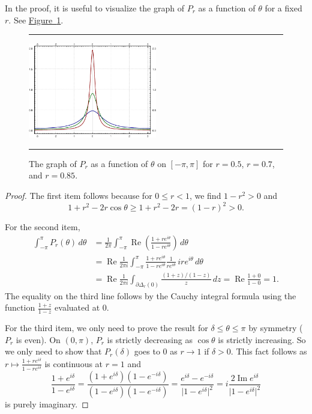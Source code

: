 \documentclass[12pt,openany]{book}
\renewcommand{\Re}{\operatorname{Re}}
\renewcommand{\Im}{\operatorname{Im}}
\newcommand{\sabs}[1]{\lvert {#1} \rvert}
\theoremstyle{plain}
\theoremstyle{remark}
\theoremstyle{definition}
\newenvironment{myfig}{%
\begin{figure}[h!t]
\noindent\rule{\textwidth}{0.5pt}\vspace{12pt}\par\centering}%
{\par\noindent\rule{\textwidth}{0.5pt}
\end{figure}}
\theoremstyle{exercise}
\theoremstyle{example}
\newcommand{\figureref}[1]{\hyperref[#1]{Figure~\ref*{#1}}}
\begin{document}
In the proof, it is useful to visualize the graph of
$P_r$ as a function of $\theta$ for a fixed $r$.
See \figureref{fig:poisson2dgraph}.

\begin{myfig}
\includegraphics[width=0.5\textwidth]{figures/poisson-kernel.pdf}
\caption{The graph of $P_r$ as a function of $\theta$ on $[-\pi,\pi]$ for
$r=0.5$, $r=0.7$, and $r=0.85$.\label{fig:poisson2dgraph}}
\end{myfig}

\begin{proof}
The first item follows because
for $0 \leq r < 1$, we find
$1-r^2 > 0$
and
\begin{equation*}
1+r^2-2r \cos\theta \geq 1+r^2-2r = {(1-r)}^2 > 0 .
\end{equation*}

For the second item,
\begin{equation*}
\begin{split}
\int_{-\pi}^{\pi}
P_r(\theta) \, d\theta
& =
\frac{1}{2\pi}
\int_{-\pi}^{\pi}
\Re
\left(
\frac{1+re^{i\theta}}{1-re^{i\theta}}
\right)
\, d\theta
\\
& =
\Re
\frac{1}{2\pi i}
\int_{-\pi}^{\pi}
\frac{1+re^{i\theta}}{1-re^{i\theta}} \frac{1}{re^{i\theta}} \,
ire^{i\theta}
\, d\theta
\\
& = 
\Re
\frac{1}{2\pi i}
\int_{\partial \Delta_r(0)}
\frac{(1+z)/(1-z)}{z} \, dz
=
\Re \frac{1+0}{1-0} = 1 .
\end{split}
\end{equation*}
The equality on the third line follows by the Cauchy integral formula
using the function $\frac{1+z}{1-z}$ evaluated at $0$.

For the third item, we only need to prove the
result for $\delta \leq \theta \leq \pi$ by symmetry ($P_r$ is even).
On $(0,\pi)$, $P_r$ is strictly decreasing as $\cos \theta$ is strictly
increasing.  So we only need to show that $P_r(\delta)$ goes to $0$
as $r \to 1$ if $\delta > 0$.
This fact follows as $r \mapsto
\frac{1+re^{i\delta}}{1-re^{i\delta}}$
is continuous at $r=1$ and
\begin{equation*}
\frac{1+e^{i\delta}}{1-e^{i\delta}}
=
\frac{(1+e^{i\delta})(1-e^{-i\delta})}{(1-e^{i\delta})(1-e^{-i\delta})}
=
\frac{e^{i\delta}-e^{-i\delta}}{\sabs{1-e^{i\delta}}^2}
=
i \frac{2\Im e^{i\delta}}{\sabs{1-e^{i\delta}}^2}
\end{equation*}
is purely imaginary.
\end{proof}
\end{document}
